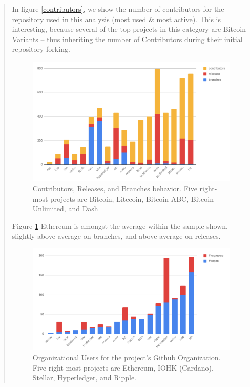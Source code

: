 \documentclass[12pt, titlepage, twocolumn]{report}
\begin{document}
\begin{quotation}
In figure \ref{contributors}, we show the number of contributors for the repository used in this analysis (most used \& most active). This is interesting, because several of the top projects in this category are Bitcoin Variants -- thus inheriting the number of Contributors during their initial repository forking.


\begin{figure}[ht]
\centering
	\includegraphics[width=\textwidth]{contrib_releases_branches}
	\caption{Contributors, Releases, and Branches behavior. Five right-most projects are Bitcoin, Litecoin, Bitcoin ABC, Bitcoin Unlimited, and Dash}
	\label{contrib_releases_branches}
\end{figure}

Figure \ref{contrib_releases_branches} Ethereum is amongst the average within the sample shown, slightly above average on branches, and above average on releases.


\begin{figure}[ht]
\centering
	\includegraphics[width=\textwidth]{org_users_repos}
	\caption{Organizational Users for the project's Github Organization. Five right-most projects are Ethereum, IOHK (Cardano), Stellar, Hyperledger, and Ripple.}
	\label{org_users_repos}
\end{figure}


\end{quotation}
\end{document}
